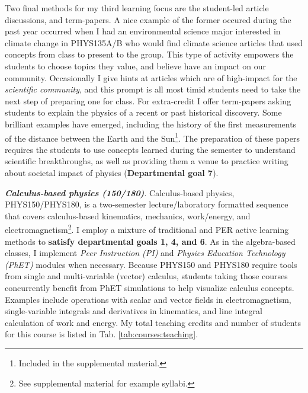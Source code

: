 \documentclass[../../../main.tex]{subfiles}
\begin{document}
Two final methods for my third learning focus are the student-led article discussions, and term-papers.  A nice example of the former occured during the past year occurred when I had an environmental science major interested in climate change in PHYS135A/B who would find climate science articles that used concepts from class to present to the group.  This type of activity empowers the students to choose topics they value, and believe have an impact on our community.  Occasionally I give hints at articles which are of high-impact for the \textit{scientific community}, and this prompt is all most timid students need to take the next step of preparing one for class.  For extra-credit I offer term-papers asking students to explain the physics of a recent or past historical discovery.  Some brilliant examples have emerged, including the history of the first measurements of the distance between the Earth and the Sun\footnote{Included in the supplemental material.}.  The preparation of these papers requires the students to use concepts learned during the semester to understand scientific breakthroughs, as well as providing them a venue to practice writing about societal impact of physics (\textbf{Departmental goal 7}).  \\ \hspace{0.1cm}

\textbf{\textit{Calculus-based physics (150/180)}}. Calculus-based physics, PHYS150/PHYS180, is a two-semester lecture/laboratory formatted sequence that covers calculus-based kinematics, mechanics, work/energy, and electromagnetism\footnote{See supplemental material for example syllabi.}.  I employ a mixture of traditional and PER active learning methods to \textbf{satisfy departmental goals 1, 4, and 6}.  As in the algebra-based classes, I implement \textit{Peer Instruction (PI)} \cite{mazur2013peer} and \textit{Physics Education Technology (PhET)} \cite{phet} modules when necessary.  Because PHYS150 and PHYS180 require tools from single and multi-variable (vector) calculus, students taking those courses concurrently benefit from PhET simulations to help visualize calculus concepts.  Examples include operations with scalar and vector fields in electromagnetism, single-variable integrals and derivatives in kinematics, and line integral calculation of work and energy. My total teaching credits and number of students for this course is listed in Tab. \ref{tab:courses:teaching}. \\ \hspace{0.1cm}
\end{document}
